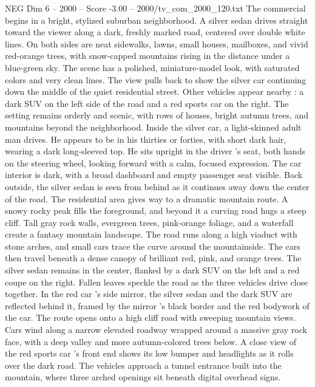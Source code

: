 \begin{textsample}{NEG Dim 6 – 2000 – Score -3.00 – 2000/tv\_com\_2000\_120.txt}  \label{ex:f6_neg_042}
The commercial begins in a bright, stylized suburban neighborhood.
A silver sedan drives straight toward the viewer along a dark, freshly marked road, centered over double white lines.
On both sides are neat sidewalks, lawns, small houses, mailboxes, and vivid red-orange trees, with snow-capped mountains rising in the distance under a blue-green sky.
The scene has a polished, miniature-model look, with saturated colors and very clean lines.
The view pulls back to show the silver car continuing down the middle of the quiet residential street.
Other vehicles appear nearby : a dark SUV on the left side of the road and a red sports car on the right.
The setting remains orderly and scenic, with rows of houses, bright autumn trees, and mountains beyond the neighborhood.
Inside the silver car, a light-skinned adult man drives.
He appears to be in his thirties or forties, with short dark hair, wearing a dark long-sleeved top.
He sits upright in the driver ’s seat, both hands on the steering wheel, looking forward with a calm, focused expression.
The car interior is dark, with a broad dashboard and empty passenger seat visible.
Back outside, the silver sedan is seen from behind as it continues away down the center of the road.
The residential area gives way to a dramatic mountain route.
A snowy rocky peak fills the foreground, and beyond it a curving road hugs a steep cliff.
Tall gray rock walls, evergreen trees, pink-orange foliage, and a waterfall create a fantasy mountain landscape.
The road runs along a high viaduct with stone arches, and small cars trace the curve around the mountainside.
The cars then travel beneath a dense canopy of brilliant red, pink, and orange trees.
The silver sedan remains in the center, flanked by a dark SUV on the left and a red coupe on the right.
Fallen leaves speckle the road as the three vehicles drive close together.
In the red car ’s side mirror, the silver sedan and the dark SUV are reflected behind it, framed by the mirror ’s black border and the red bodywork of the car.
The route opens onto a high cliff road with sweeping mountain views.
Cars wind along a narrow elevated roadway wrapped around a massive gray rock face, with a deep valley and more autumn-colored trees below.
A close view of the red sports car ’s front end shows its low bumper and headlights as it rolls over the dark road.
The vehicles approach a tunnel entrance built into the mountain, where three arched openings sit beneath digital overhead signs.

\end{textsample}
